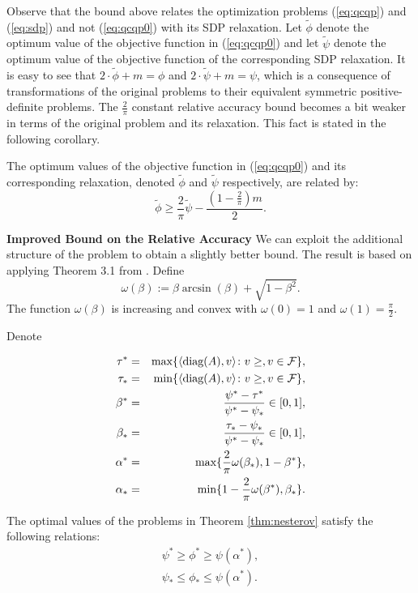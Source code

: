 Observe that the bound above relates the optimization problems (\ref{eq:qcqp}) and (\ref{eq:sdp})
and not (\ref{eq:qcqp0}) with its SDP relaxation. Let $\widetilde{\phi}$ denote the optimum value
of the objective function in (\ref{eq:qcqp0}) and let $\widetilde{\psi}$ denote the optimum value
of the objective function of the corresponding SDP relaxation. It is easy to see that
$2 \cdot \widetilde{\phi} + m = \phi$ and $2 \cdot \widetilde{\psi} + m = \psi$, which is a
consequence of transformations of the original problems to their equivalent symmetric
positive-definite problems. The $\frac{2}{\pi}$ constant relative accuracy bound becomes a bit
weaker in terms of the original problem and its relaxation. This fact is stated in the following corollary.
\begin{corollary}
The optimum values of the objective function in (\ref{eq:qcqp0}) and its corresponding relaxation,
denoted $\widetilde{\phi}$ and $\widetilde{\psi}$ respectively, are related by:
$$\widetilde{\phi} \geq \frac{2}{\pi} \widetilde{\psi} - \frac{(1 - \frac{2}{\pi}) m}{2}.$$
\end{corollary}

\noindent\textbf{Improved Bound on the Relative Accuracy}
We can exploit the additional structure of the problem to obtain a slightly better bound.
The result is based on applying Theorem 3.1 from \cite{Nesterov98globalquadratic}.
Define
$$\omega\left(\beta\right) := \beta \arcsin\left(\beta\right) + \sqrt{1 - \beta^2}.$$
The function $\omega\left(\beta\right)$ is increasing and convex with
$\omega\left(0\right) = 1$ and $\omega\left(1\right) = \frac{\pi}{2}$.

\begin{theorem}\label{thm:nesterov2}
Denote

\begin{align*}
\tau^* &=&  \textnormal{max}\{ \langle \textnormal{diag}(A),v \rangle \colon v \geq, v \in \mathcal{F}  \}, \\ 
\tau_* &=& \textnormal{min}\{ \langle \textnormal{diag}(A),v \rangle \colon v \geq, v \in \mathcal{F}  \}, \\
\beta^* &=& \frac{\psi^* - \tau^*}{\psi^*-\psi_*} \in [0,1], \\
\beta_* &=& \frac{\tau_* - \psi_*}{\psi^*-\psi_*} \in [0,1], \\
\alpha^* &=& \textnormal{max}\{\frac{2}{\pi}\omega(\beta_*), 1 - \beta^* \}, \\
\alpha_* &=& \textnormal{min}\{1 - \frac{2}{\pi}\omega(\beta^*), \beta_* \}.
\end{align*}

The optimal values of the problems in Theorem \ref{thm:nesterov} satisfy the following relations:
\begin{align*}
\psi^* \geq \phi^* \geq \psi(\alpha^*), \\
\psi_* \leq \phi_* \leq \psi(\alpha^*). \\
\end{align*}
\end{theorem}


